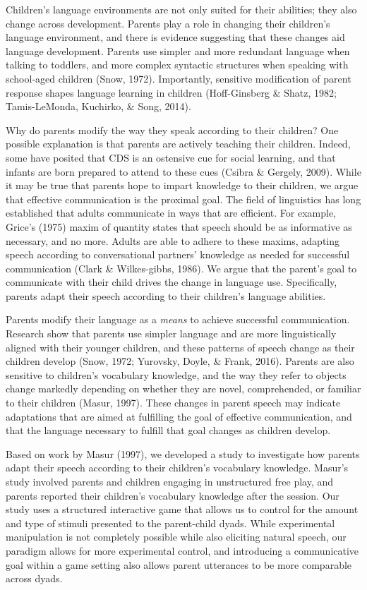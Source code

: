 \documentclass[10pt, letterpaper]{article}
\begin{document}
Children's language environments are not only suited for their
abilities; they also change across development. Parents play a role in
changing their children's language environment, and there is evidence
suggesting that these changes aid language development. Parents use
simpler and more redundant language when talking to toddlers, and more
complex syntactic structures when speaking with school-aged children
(Snow, 1972). Importantly, sensitive modification of parent response
shapes language learning in children (Hoff-Ginsberg \& Shatz, 1982;
Tamis-LeMonda, Kuchirko, \& Song, 2014).

Why do parents modify the way they speak according to their children?
One possible explanation is that parents are actively teaching their
children. Indeed, some have posited that CDS is an ostensive cue for
social learning, and that infants are born prepared to attend to these
cues (Csibra \& Gergely, 2009). While it may be true that parents hope
to impart knowledge to their children, we argue that effective
communication is the proximal goal. The field of linguistics has long
established that adults communicate in ways that are efficient. For
example, Grice's (1975) maxim of quantity states that speech should be
as informative as necessary, and no more. Adults are able to adhere to
these maxims, adapting speech according to conversational partners'
knowledge as needed for successful communication (Clark \& Wilkes-gibbs,
1986). We argue that the parent's goal to communicate with their child
drives the change in language use. Specifically, parents adapt their
speech according to their children's language abilities.

Parents modify their language as a \emph{means} to achieve successful
communication. Research show that parents use simpler language and are
more linguistically aligned with their younger children, and these
patterns of speech change as their children develop (Snow, 1972;
Yurovsky, Doyle, \& Frank, 2016). Parents are also sensitive to
children's vocabulary knowledge, and the way they refer to objects
change markedly depending on whether they are novel, comprehended, or
familiar to their children (Masur, 1997). These changes in parent speech
may indicate adaptations that are aimed at fulfilling the goal of
effective communication, and that the language necessary to fulfill that
goal changes as children develop.

Based on work by Masur (1997), we developed a study to investigate how
parents adapt their speech according to their children's vocabulary
knowledge. Masur's study involved parents and children engaging in
unstructured free play, and parents reported their children's vocabulary
knowledge after the session. Our study uses a structured interactive
game that allows us to control for the amount and type of stimuli
presented to the parent-child dyads. While experimental manipulation is
not completely possible while also eliciting natural speech, our
paradigm allows for more experimental control, and introducing a
communicative goal within a game setting also allows parent utterances
to be more comparable across dyads.
\end{document}
